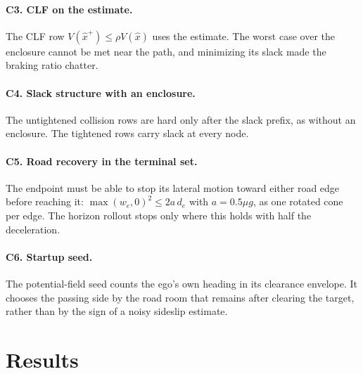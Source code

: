 \documentclass[11pt]{article}
\begin{document}
\paragraph{C3. CLF on the estimate.} The CLF row $V(\hat x^+)\le\rho
V(\hat x)$ uses the estimate. The worst case over the enclosure cannot be met
near the path, and minimizing its slack made the braking ratio chatter.

\paragraph{C4. Slack structure with an enclosure.} The untightened collision
rows are hard only after the slack prefix, as without an enclosure. The
tightened rows carry slack at every node.

\paragraph{C5. Road recovery in the terminal set.} The endpoint must be able
to stop its lateral motion toward either road edge before reaching it:
$\max(w_e,0)^2\le2a\,d_e$ with $a=0.5\mu g$, as one rotated cone per edge.
The horizon rollout stops only where this holds with half the deceleration.

\paragraph{C6. Startup seed.} The potential-field seed counts the ego's own
heading in its clearance envelope. It chooses the passing side by the road
room that remains after clearing the target, rather than by the sign of a
noisy sideslip estimate.

\section{Results}
\end{document}
